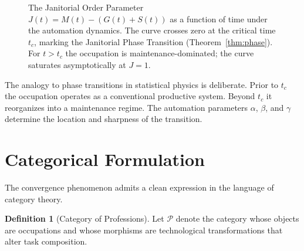 \documentclass[12pt,a4paper]{article}
\theoremstyle{plain}
\theoremstyle{definition}
\newtheorem{definition}[theorem]{Definition}
\theoremstyle{remark}
\begin{document}
\begin{figure}[h]
\centering
{}
\caption{The Janitorial Order Parameter $J(t) = M(t)-(G(t)+S(t))$ as a
function of time under the automation dynamics. The curve crosses zero at
the critical time $t_c$, marking the Janitorial Phase Transition
(Theorem~\ref{thm:phase}). For $t > t_c$ the occupation is maintenance-dominated;
the curve saturates asymptotically at $J=1$.}
\label{fig:phase}
\end{figure}

The analogy to phase transitions in statistical physics is deliberate.  Prior
to $t_c$ the occupation operates as a conventional productive system.  Beyond
$t_c$ it reorganizes into a maintenance regime.  The automation parameters
$\alpha$, $\beta$, and $\gamma$ determine the location and sharpness of the
transition.

\section{Categorical Formulation}
\label{sec:categorical}

The convergence phenomenon admits a clean expression in the language of
category theory.

\begin{definition}[Category of Professions]
Let $\mathcal{P}$ denote the category whose objects are occupations and whose
morphisms are technological transformations that alter task composition.
\end{definition}
\end{document}
